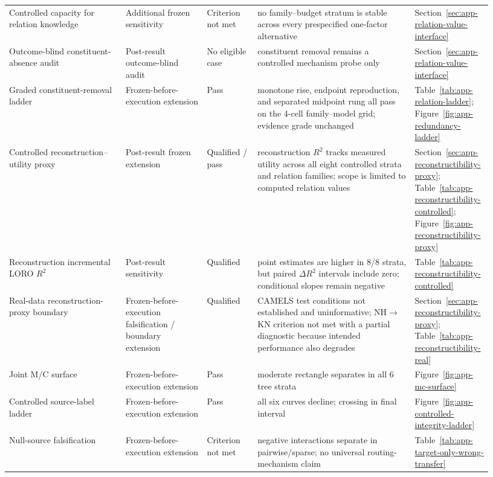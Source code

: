 {\begin{longtable}{P{0.23\linewidth}P{0.16\linewidth}P{0.10\linewidth}P{0.31\linewidth}P{0.13\linewidth}}
Controlled capacity for relation knowledge & Additional frozen sensitivity & Criterion not met & no family--budget stratum is stable across every prespecified one-factor alternative & Section~\ref{sec:app-relation-value-interface} \\
Outcome-blind constituent-absence audit & Post-result outcome-blind audit & No eligible case & constituent removal remains a controlled mechanism probe only & Section~\ref{sec:app-relation-value-interface} \\
Graded constituent-removal ladder & Frozen-before-execution extension & Pass & monotone rise, endpoint reproduction, and separated midpoint rung all pass on the 4-cell family--model grid; evidence grade unchanged & Table~\ref{tab:app-relation-ladder}; Figure~\ref{fig:app-redundancy-ladder} \\
Controlled reconstruction--utility proxy & Post-result frozen extension & Qualified / pass & reconstruction $R^2$ tracks measured utility across all eight controlled strata and relation families; scope is limited to computed relation values & Section~\ref{sec:app-reconstructibility-proxy}; Table~\ref{tab:app-reconstructibility-controlled}; Figure~\ref{fig:app-reconstructibility-proxy} \\
Reconstruction incremental LORO $R^2$ & Post-result sensitivity & Qualified & point estimates are higher in 8/8 strata, but paired $\Delta R^2$ intervals include zero; conditional slopes remain negative & Table~\ref{tab:app-reconstructibility-controlled} \\
Real-data reconstruction-proxy boundary & Frozen-before-execution falsification / boundary extension & Qualified & CAMELS test conditions not established and uninformative; NH$\rightarrow$KN criterion not met with a partial diagnostic because intended performance also degrades & Section~\ref{sec:app-reconstructibility-proxy}; Table~\ref{tab:app-reconstructibility-real} \\
Joint M/C surface & Frozen-before-execution extension & Pass & moderate rectangle separates in all 6 tree strata & Figure~\ref{fig:app-mc-surface} \\
Controlled source-label ladder & Frozen-before-execution extension & Pass & all six curves decline; crossing in final interval & Figure~\ref{fig:app-controlled-integrity-ladder} \\
Null-source falsification & Frozen-before-execution extension & Criterion not met & negative interactions separate in pairwise/sparse; no universal routing-mechanism claim & Table~\ref{tab:app-target-only-wrong-transfer} \\

\end{longtable}}
